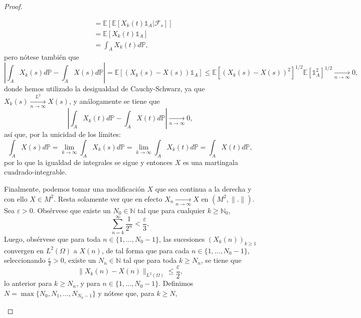 \documentclass[letterpaper]{article}
\newcommand{\N}{\mathbb N}
\newcommand{\F}{\mathcal{F}}
\newcommand{\abs}[1]{\left\lvert #1 \right\rvert}
\renewcommand{\to}{\rightarrow}
\newcommand{\E}{\mathbb{E}}
\renewcommand{\P}{\mathbb{P}}
\newcommand{\1}{\mathds{1}}
\theoremstyle{definition}
\theoremstyle{definition}
\theoremstyle{definition}
\theoremstyle{definition}
\theoremstyle{definition}
\begin{document}
\begin{enumerate}
\begin{proof}
\begin{itemize}
\begin{align*}
                &=\E\left[\E\left[X_k(t)\1_A|\F_s\right]\right]\\
                &=\E\left[X_k(t)\1_A\right]\\
                &=\int_AX_k(t)d\P,
            \end{align*}
            pero nótese también que 
            \[
            \abs{\int_AX_k(s)d\P-\int_AX(s)d\P}=\E\left[\left(X_k(s)-X(s)\right)\1_A\right]\leq \E\left[(X_k(s)-X(s))^2\right]^{1/2}\E\left[\1^2_A\right]^{1/2}\xrightarrow[n\to \infty]{}0,
            \]
            donde hemos utilizado la desigualdad de Cauchy-Schwarz, ya que $X_k(s)\xrightarrow[n\to \infty ]{L^2}X(s)$, y análogamente se tiene que 
            \[
                \abs{\int_AX_k(t)d\P-\int_AX(t)d\P}\xrightarrow[n\to \infty]{}0,
            \]
            así que, por la unicidad de los límites:
            \[
            \int_A X(s)d\P=\lim_{k\to \infty}\int_AX_k(s)d\P=\lim_{k\to \infty}\int_AX_k(t)d\P=\int_A X(t) d\P,   
            \]
            por lo que la igualdad de integrales se sigue y entonces $X$ es una martingala cuadrado-integrable.
            \newline
            
            Finalmente, podemos tomar una modificación $X$ que sea continua a la derecha y con ello $X\in M^2$.
            Resta solamente ver que en efecto $X_n\xrightarrow[n\to \infty]{}X$ en $(M^2,\|.\|)$. Sea $\varepsilon>0$. Obsérvese que
            existe un $N_0\in \N$ tal que para cualquier $k\geq\N_0$, 
            \[
            \sum_{n=k}^{\infty} \frac{1}{2^{n}}<\frac{\varepsilon}{3},   
            \]
            Luego, obsérvese que para toda $n\in \{1,...,N_0-1\}$, las sucesiones $(X_k(n))_{k\geq1}$ convergen 
            en $L^2(\Omega)$ a $X(n)$, de tal forma que para cada $n\in \{1,...,N_0-1\}$,  seleccionando 
            $\frac{\varepsilon}{2}>0$, existe un $N_n\in \N$ tal que para toda $k\geq N_n$, se tiene que 
            \[
            \|X_k(n)-X(n)\|_{L^2(\Omega)}\leq \frac{\varepsilon}{2},    
            \]
            lo anterior para $k\geq N_n$, y para $n\in \{1,...,N_0-1\}$. Definimos $N=\max\{N_0,N_1,...,N_{N_0-1}\}$ y nótese que, para $k\geq N$,
             

\end{itemize}
\end{proof}
\end{enumerate}
\end{document}
